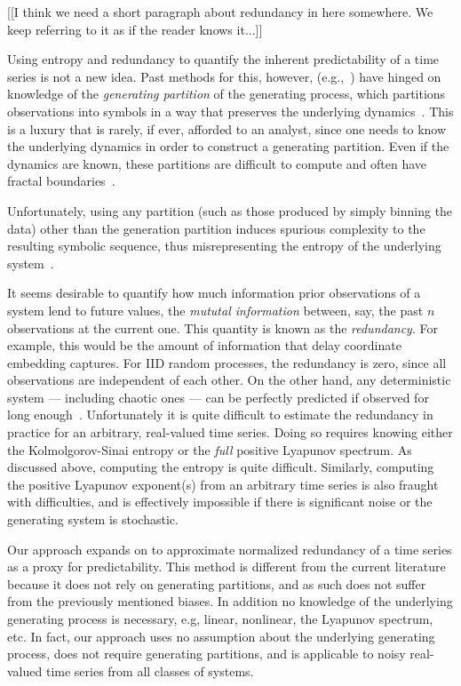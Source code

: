 [[I think we need a short paragraph about redundancy in here
    somewhere.  We keep referring to it as if the reader knows it...]]

Using entropy and redundancy to quantify the inherent predictability
of a time series is not a new idea.  Past methods for this, however,
(e.g.,~\cite{Shannon1951, mantegna1994linguistic}) have hinged on
knowledge of the \emph{generating partition} of the generating
process, which partitions observations into symbols in a way that
preserves the underlying dynamics~\cite{lind95}.  This is a luxury
that is rarely, if ever, afforded to an analyst, since one needs to
know the underlying dynamics in order to construct a generating
partition.  Even if the dynamics are known, these partitions are
difficult to compute and often have fractal
boundaries~\cite{eisele1999}.

Unfortunately, using any partition (such as those produced by simply
binning the data) other than the generation partition induces spurious
complexity to the resulting symbolic sequence, thus misrepresenting
the entropy of the underlying system~\cite{bollt2001}.

It seems desirable to quantify how much information prior observations of a system lend to future values, the \emph{mututal information} between, say, the past $n$ observations at the current one. This quantity is known as the \emph{redundancy}. For example, this would be the amount of information that delay coordinate embedding captures. For IID random processes,  the redundancy is zero, since all observations are independent of each other. On the other hand, any deterministic system --- including chaotic ones --- can be perfectly predicted if observed for long enough~\cite{weigend-book}. Unfortunately it is quite difficult to estimate the redundancy in practice for an arbitrary, real-valued time series. Doing so requires knowing either the Kolmolgorov-Sinai entropy or the \emph{full} positive Lyapunov spectrum. As discussed above, computing the entropy is quite difficult. Similarly, computing the positive Lyapunov exponent(s) from an arbitrary time series is also fraught with difficulties, and is effectively impossible if there is significant noise or the generating system is stochastic.

Our approach expands on \cite{bandt2002per} to approximate normalized redundancy of a time series as a proxy for predictability. This method is different from the current literature because it does not rely on generating partitions, and as such does not suffer from the previously mentioned biases. In addition no knowledge of the underlying generating process is necessary, e.g, linear, nonlinear, the Lyapunov spectrum, etc. In fact, our approach uses no assumption about the underlying generating process, does not require generating partitions, and is applicable to noisy real-valued time series from all classes of systems.


